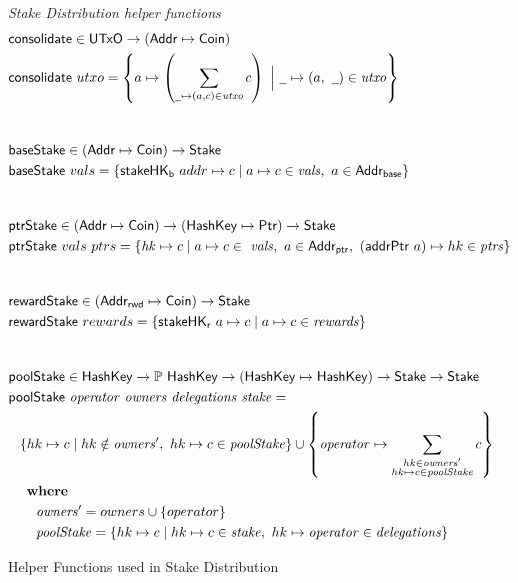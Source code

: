 \begin{figure}[hbt]
  \emph{Stake Distribution helper functions}
  \begin{align*}
      & \fun{consolidate} \in \UTxO \to (\Addr \mapsto \Coin) \\
      & \fun{consolidate}~{utxo} =
        \left\{a \mapsto \left(\sum_{\wcard\mapsto(a,c)\in\var{utxo}}c\right)
        ~\Big\vert~
        \wcard\mapsto(a,~\wcard)\in\var{utxo} \right\} \\
      \nextdef
      & \fun{baseStake} \in (\Addr\mapsto\Coin) \to \Stake \\
      & \fun{baseStake}~{vals} =
          \{\fun{stakeHK_b}~{addr}\mapsto c \mid a\mapsto c\in\var{vals},~a\in\AddrB\} \\
      \nextdef
      & \fun{ptrStake} \in (\Addr\mapsto\Coin) \to (\HashKey\mapsto\Ptr) \to \Stake \\
      & \fun{ptrStake}~{vals}~{ptrs} =
          \{\var{hk}\mapsto c
          \mid a\mapsto
          c\in~\var{vals},~a\in\AddrP,~(\fun{addrPtr}~a) \mapsto hk\in\var{ptrs}\} \\
      \nextdef
      & \fun{rewardStake} \in (\AddrRWD\mapsto\Coin) \to \Stake \\
      & \fun{rewardStake}~{rewards} =
          \{\fun{stakeHK_r}~{a}\mapsto c \mid a\mapsto c\in\var{rewards}\} \\
      \nextdef
      & \fun{poolStake} \in \HashKey \to \powerset{\HashKey} \to (\HashKey \mapsto \HashKey)
          \to \Stake \to \Stake \\
      & \poolStake{operator}{owners}{delegations}{stake} = \\
      & ~~ \left\{hk\mapsto c \mid hk\notin\var{owners'},~hk\mapsto c\in\var{poolStake} \right\}
           \cup
           \left\{ \var{operator}\mapsto
             \sum_{\substack{hk\in\var{owners'} \\ hk\mapsto c\in\var{poolStake}}} c\right\} \\
      & ~~ \where \\
      & ~~~~~~ \var{owners'} = owners \cup \{operator\} \\
      & ~~~~~~ \var{poolStake} =
                 \{hk \mapsto c
                 \mid
                 hk \mapsto c\in\var{stake},~hk\mapsto\var{operator}\in\var{delegations} \} \\
  \end{align*}
  \caption{Helper Functions used in Stake Distribution}
  \label{fig:functions:helper-stake-distribution}
\end{figure}


